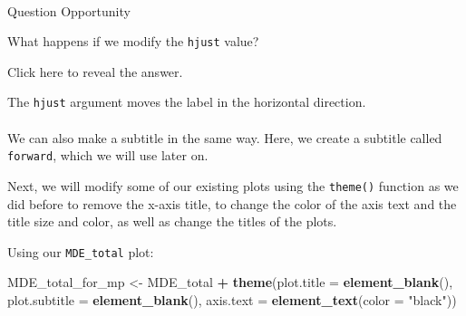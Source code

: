 \documentclass[
]{article}
\newenvironment{Shaded}{\begin{snugshade}}{\end{snugshade}}
\newcommand{\CharTok}[1]{\textcolor[rgb]{0.31,0.60,0.02}{#1}}
\newcommand{\DataTypeTok}[1]{\textcolor[rgb]{0.13,0.29,0.53}{#1}}
\newcommand{\DecValTok}[1]{\textcolor[rgb]{0.00,0.00,0.81}{#1}}
\newcommand{\FloatTok}[1]{\textcolor[rgb]{0.00,0.00,0.81}{#1}}
\newcommand{\KeywordTok}[1]{\textcolor[rgb]{0.13,0.29,0.53}{\textbf{#1}}}
\newcommand{\NormalTok}[1]{#1}
\newcommand{\OperatorTok}[1]{\textcolor[rgb]{0.81,0.36,0.00}{\textbf{#1}}}
\newcommand{\StringTok}[1]{\textcolor[rgb]{0.31,0.60,0.02}{#1}}
\begin{document}
\hypertarget{section-48}{%
\paragraph{}\label{section-48}}

Question Opportunity

What happens if we modify the \texttt{hjust} value?

Click here to reveal the answer.

The \texttt{hjust} argument moves the label in the horizontal direction.

\hypertarget{section-49}{%
\paragraph{}\label{section-49}}

We can also make a subtitle in the same way. Here, we create a subtitle
called \texttt{forward}, which we will use later on.

\begin{Shaded}
\end{Shaded}

Next, we will modify some of our existing plots using the
\texttt{theme()} function as we did before to remove the x-axis title,
to change the color of the axis text and the title size and color, as
well as change the titles of the plots.

Using our \texttt{MDE\_total} plot:

\begin{Shaded}
\begin{Highlighting}[]
\NormalTok{MDE_total_for_mp <-}\StringTok{ }\NormalTok{MDE_total }\OperatorTok{+}
\StringTok{  }\KeywordTok{theme}\NormalTok{(}\DataTypeTok{plot.title =} \KeywordTok{element_blank}\NormalTok{(),}
        \DataTypeTok{plot.subtitle =} \KeywordTok{element_blank}\NormalTok{(),}
        \DataTypeTok{axis.text =} \KeywordTok{element_text}\NormalTok{(}\DataTypeTok{color =} \StringTok{"black"}\NormalTok{))}
\end{Highlighting}
\end{Shaded}
\end{document}
